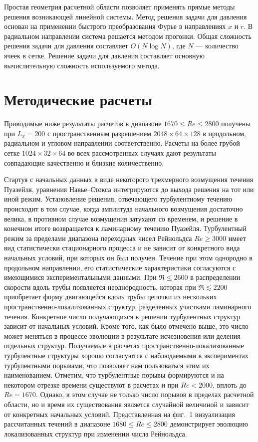 Простая геометрия расчетной области позволяет применять прямые методы решения возникающей линейной системы. Метод решения задачи для давления основан на применении быстрого преобразования Фурье в направлениях $x$ и $r$. В радиальном направлении система решается методом прогонки. Общая сложность решения задачи для давления составляет $O(N \log N)$, где $N$ --- количество ячеек в сетке. Решение задачи для давления составляет основную вычислительную сложность используемого метода. 

\section{Методические расчеты}


Приводимые ниже результаты расчетов в диапазоне $1670\leqslant Re\leqslant 2800$ получены при $L_x=200$ с пространственным разрешением $2048 \times 64 \times 128$ в продольном, радиальном и угловом направлении соответственно. Расчеты на более грубой сетке $1024\times32\times64$ во всех рассмотренных случаях дают результаты совпадающие качественно и близкие количественно.

Стартуя с начальных данных в виде некоторого трехмерного возмущения течения Пуазейля, уравнения Навье--Стокса интегрируются до выхода решения на тот или иной режим. Установление решения, отвечающего турбулентному течению происходит в том случае, когда амплитуда начального возмущения достаточно велика, в противном случае возмущения затухают со временем, и решение в конечном итоге возвращается к ламинарному течению Пуазейля. Турбулентный режим за пределами диапазона переходных чисел Рейнольдса $Re\geqslant3000$ имеет вид статистически стационарного процесса и не зависит от конкретного вида начальных условий, при которых он был получен. Течение при этом однородно в продольном направлении, его статистические характеристики согласуются с имеющимися экспериментальными данными. При $\Re\leqslant2600$ в распределении скорости вдоль трубы появляется неоднородность, которая при $\Re\lesssim2200$ приобретает форму двигающейся вдоль трубы цепочки из нескольких пространственно-локализованных структур, разделенных участками ламинарного течения. Конкретное число получающихся в решении турбулентных структур зависит от начальных условий. Кроме того, как было отмечено выше, это число может меняться в процессе эволюции в результате исчезновения или деления отдельных структур. Получаемые в расчетах пространственно-локализованные турбулентные структуры хорошо согласуются с наблюдаемыми в экспериментах турбулентными порывами, что позволяет нам пользоваться этим их наименованием. Отметим, что турбулентные порывы формируются и на некотором отрезке времени существуют в расчетах и при $Re<2000$, вплоть до $Re=1670$. Однако, в этом случае не только число порывов в пределах расчетной области, но и время их существования является случайной величиной и зависит от конкретных начальных условий. Представленная на фиг.~1 визуализация рассчитанных течений в диапазоне $1680\leqslant Re\leqslant2800$ демонстрирует эволюцию локализованных структур при изменении числа Рейнольдса.




